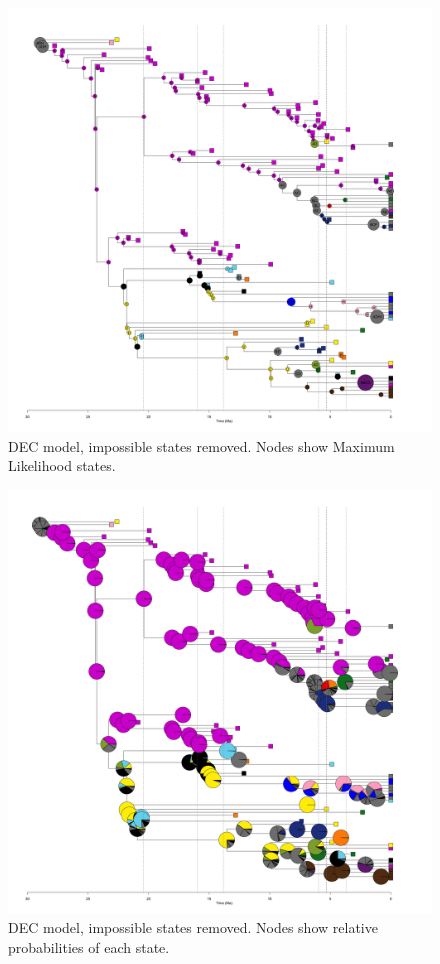 \documentclass[a4paper, 12pt]{article}
\begin{document}
\begin{figure}[H]
 \centering
  \includegraphics[width = \linewidth]{figures/all-pinnipeds-DEC-impossible-MLstates.png}
  \caption{DEC model, impossible states removed. Nodes show Maximum Likelihood states.}
  \label{fig-all-dec-ml}
\end{figure} 

\begin{figure}[H]
 \centering
  \includegraphics[width = \linewidth]{figures/all-pinnipeds-DEC-impossible-pies.png}
  \caption{DEC model, impossible states removed. Nodes show relative probabilities of each state.}
  \label{fig-all-dec-pie}
\end{figure} 
\end{document}
